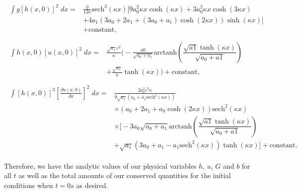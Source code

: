\begin{align*}
\begin{split}
\int g\left[h(x,0)\right]^2 \; dx ={}& \frac{g}{12 \kappa }\text{sech}^3\left(\kappa x\right) \Bigg[9a_0^2 \kappa x \cosh\left(\kappa x\right) + 3 a_0^2 \kappa x \cosh\left(3\kappa x\right) \\ &+ 4 a_1 \left(3a_0 + 2 a_1 + \left(3a_0 + a_1\right)\cosh\left(2\kappa x\right)\right) \sinh\left(\kappa x\right)\Bigg] \\ &+ \text{constant},
\end{split}\\ \\
\begin{split}
\int h(x,0)\left[u(x,0)\right]^2 \; dx = {}& \frac{\sqrt{a_1}c^2}{\kappa} \Bigg( -\frac{a0}{\sqrt{a_0 + a_1}} \text{arctanh}\left(\dfrac{\sqrt{a1} \tanh\left(\kappa x\right)}{\sqrt{a_0 + a1}}\right)\\ &+ \frac{\sqrt{a_1}}{\kappa}\tanh\left(\kappa x\right)\Bigg)  + \text{constant},
\end{split} 
\\ \\
\begin{split}
\int \left[h(x,0)\right]^3 \left[\frac{\partial u(x,0)}{\partial x}\right]^2 \; dx = {}& \frac{2a_0^2c^2 \kappa }{9 \sqrt{a_1} \left(a_0 + a_1\text{sech}^2\left(\kappa x \right) \right)}   \\ &\times\left(a_0 + 2a_1 + a_0 \cosh\left(2\kappa x\right) \right) \text{sech}^2\left(\kappa x\right) \\&\times \Bigg[-3 a_0 \sqrt{a_0 + a_1}\text{arctanh}\left(\dfrac{\sqrt{a1} \tanh\left(\kappa x\right)}{\sqrt{a_0 + a1}}\right)  \\ &+ \sqrt{a_1}\left(3a_0 + a_1 - a_1\text{sech}^2\left(\kappa x\right)\right)\tanh(\kappa x) \Bigg]+ \text{constant}.
\end{split}
\end{align*}

Therefore, we have the analytic values of our physical variables $h$, $u$, $G$ and $b$ for all $t$ as well as the total amounts of our conserved quantities for the initial conditions when $t=0s$ as desired.

